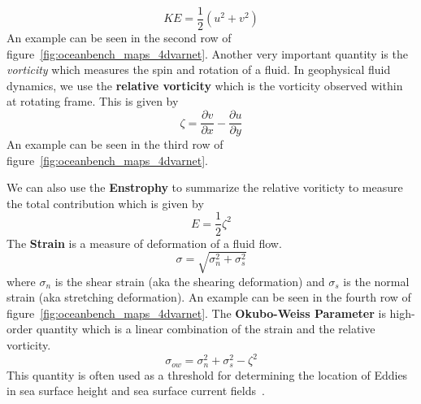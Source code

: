 %
\begin{equation} \label{eq:kineticenergy}
    KE = \frac{1}{2}\left(u^2 + v^2\right)
\end{equation}
%
An example can be seen in the second row of figure~\ref{fig:oceanbench_maps_4dvarnet}.
%
%
Another very important quantity is the \textit{vorticity} which measures the spin and rotation of a fluid. In geophysical fluid dynamics, we use the \textbf{relative vorticity} which is the vorticity observed within at rotating frame.
This is given by
%
\begin{equation} \label{eq:relvorticity}
    \zeta = \frac{\partial v}{\partial x} - \frac{\partial u}{\partial y}
\end{equation}
%
An example can be seen in the third row of figure~\ref{fig:oceanbench_maps_4dvarnet}.
%

%
We can also use the \textbf{Enstrophy} to summarize the relative voriticty to measure the total contribution which is given by
%
\begin{equation} \label{eq:enstrophy}
    E = \frac{1}{2}\zeta^2
\end{equation}
%
%
The \textbf{Strain} is a measure of deformation of a fluid flow.
%
\begin{equation} \label{eq:strain}
    \sigma = \sqrt{\sigma_n^2 + \sigma_s^2}
\end{equation}
%
where $\sigma_n$ is the shear strain (aka the shearing deformation) and $\sigma_s$ is the normal strain (aka stretching deformation). An example can be seen in the fourth row of figure~\ref{fig:oceanbench_maps_4dvarnet}.
%
The \textbf{Okubo-Weiss Parameter} is high-order quantity which is a linear combination of the strain and the relative vorticity.
%
\begin{equation} \label{eq:okuboweiss}
    \sigma_{ow} = \sigma_n^2 + \sigma_s^2 - \zeta^2
\end{equation}
%
This quantity is often used as a threshold for determining the location of Eddies in sea surface height and sea surface current fields~\cite{OKUBO, WEISS, OKUBOWEISS}.